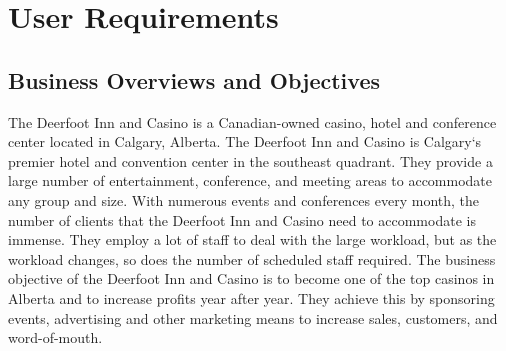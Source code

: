 \documentclass[letterpaper,12pt]{report}
\begin{document}

\part{User Requirements}

\chapter{Business Overviews and Objectives}
\hspace{1cm}The Deerfoot Inn and Casino is a Canadian-owned casino, hotel and conference center located in Calgary, Alberta. The Deerfoot Inn and Casino is Calgary`s premier hotel and convention center in the southeast quadrant. They provide a large number of entertainment, conference, and meeting areas to accommodate any group and size. With numerous events and conferences every month, the number of clients that the Deerfoot Inn and Casino need to accommodate is immense. They employ a lot of staff to deal with the large workload, but as the workload changes, so does the number of scheduled staff required.
The business objective of the Deerfoot Inn and Casino is to become one of the top casinos in Alberta and to increase profits year after year. They achieve this by sponsoring events, advertising and other marketing means to increase sales, customers, and word-of-mouth.
\pagebreak
\end{document}
